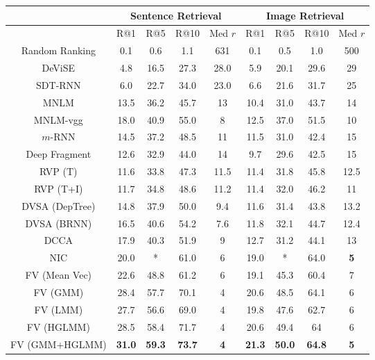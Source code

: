 \documentclass[10pt,twocolumn,letterpaper]{article}
\begin{document}
\begin{table*} \small
\begin{center}
\begin{tabular}{c|cccc|cccc}
    \hline
          & \multicolumn{4}{|c|}{Sentence Retrieval} & \multicolumn{4}{|c}{Image Retrieval}  \\
          \hline
          \hline
        & R@1 & R@5 & R@10 & Med $r$ & R@1 & R@5 & R@10 & Med $r$ \\
        \hline
        \hline
        Random Ranking & 0.1 & 0.6 & 1.1 & 631 & 0.1 & 0.5  & 1.0 & 500\\
DeViSE \cite{frome_nips2013}& 4.8 & 16.5 & 27.3 & 28.0 & 5.9 & 20.1  & 29.6 & 29\\
SDT-RNN \cite{socher_tacl2014}& 6.0 & 22.7 & 34.0 & 23.0 & 6.6 & 21.6  & 31.7 & 25\\
MNLM \cite{kiros_2014}& 13.5 & 36.2 & 45.7 & 13 & 10.4 & 31.0  & 43.7 & 14\\
MNLM-vgg \cite{kiros_2014}& 18.0 & 40.9 & 55.0 & 8 & 12.5 & 37.0  & 51.5 & 10\\
$m$-RNN \cite{mao_2014}& 14.5 & 37.2 & 48.5 & 11 & 11.5 & 31.0  & 42.4 & 15\\
Deep Fragment  \cite{karpathy_2014} & 12.6 & 32.9 & 44.0 &14 & 9.7 & 29.6  & 42.5 & 15\\
RVP (T) \cite{chen_2014}& 11.6 & 33.8 & 47.3 & 11.5 & 11.4 & 31.8  & 45.8 & 12.5\\
RVP (T+I) \cite{chen_2014}& 11.7 & 34.8 & 48.6 & 11.2 & 11.4 & 32.0  & 46.2 & 11\\
DVSA (DepTree) \cite{karpathy_dvsa_2014}& 14.8 & 37.9 & 50.0 & 9.4 & 11.6 & 31.4  & 43.8 & 13.2\\
DVSA (BRNN) \cite{karpathy_dvsa_2014}& 16.5 & 40.6 & 54.2 & 7.6 & 11.8 & 32.1  & 44.7 & 12.4\\
DCCA \cite{yan_cvpr2015} & 17.9 & 40.3 & 51.9 & 9 & 12.7 & 31.2 & 44.1 & 13\\
NIC \cite{vinyals_2014}& {20.0} & * & {61.0} & {6} & {19.0} & *  & {64.0} & \textbf{5}\\

        FV (Mean Vec) \cite{klein_cvpr2015} & 22.6 & 48.8 & 61.2 & 6 & 19.1 & 45.3 & 60.4 & 7 \\
        FV (GMM) \cite{klein_cvpr2015} & 28.4 & 57.7 & 70.1 & 4 & 20.6 & 48.5 & 64.1 & 6 \\
        FV (LMM) \cite{klein_cvpr2015} & 27.7 & 56.6 & 69.0 & 4 & 19.8 & 47.6 & 62.7 & 6 \\
        FV (HGLMM) \cite{klein_cvpr2015} & 28.5 & 58.4 & 71.7 & 4 & 20.6 & 49.4 & 64 & 6 \\
        FV (GMM+HGLMM) \cite{klein_cvpr2015} & \textbf{31.0} & \textbf{59.3} & \textbf{73.7} & \textbf{4} & \textbf{21.3} & \textbf{50.0} & \textbf{64.8} & \textbf{5} \\


\end{tabular}
\end{center}
\end{table*}
\end{document}
